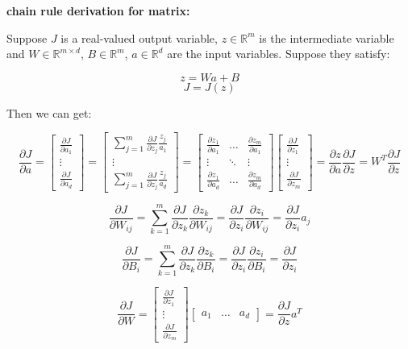 \documentclass{article}
\begin{document}
\noindent \textbf{chain rule derivation for matrix:}

\noindent Suppose \(J\) is a real-valued output variable, \(z \in \mathbb{R}^m\) is the intermediate variable and \(W \in \mathbb{R}^{m \times d}\), \(B \in \mathbb{R}^{m}\), \(a \in \mathbb{R}^d\) are the input variables. Suppose they satisfy:

\[z = W a + B\]
\[J = J(z)\]

\noindent Then we can get:

\[
\frac{\partial J}{\partial a} = 
\begin{bmatrix}
\frac{\partial J}{\partial a_1}\\
\vdots\\
\frac{\partial J}{\partial a_d}
\end{bmatrix}
= 
\begin{bmatrix}
\sum_{j = 1}^m \frac{\partial J}{\partial z_j} \frac{z_j}{a_1}\\
\vdots\\
\sum_{j = 1}^m \frac{\partial J}{\partial z_j} \frac{z_j}{a_d}
\end{bmatrix}
=
\begin{bmatrix}
\frac{\partial z_1}{\partial a_1} & \dots & \frac{\partial z_m}{\partial a_1}\\
\vdots & \ddots & \vdots\\
\frac{\partial z_1}{\partial a_d} & \dots & \frac{\partial z_m}{\partial a_d}
\end{bmatrix}
\begin{bmatrix}
\frac{\partial J}{\partial z_1}\\
\vdots\\
\frac{\partial J}{\partial z_m}
\end{bmatrix}
= \frac{\partial z}{\partial a} \frac{\partial J}{\partial z}
= W^T \frac{\partial J}{\partial z}
\]

\[
\frac{\partial J}{\partial W_{ij}} = \sum_{k = 1}^m \frac{\partial J}{\partial z_k} \frac{\partial z_k}{\partial W_{ij}} = \frac{\partial J}{\partial z_i} \frac{\partial z_i}{\partial W_{ij}} = \frac{\partial J}{\partial z_i} a_j
\]

\[
\frac{\partial J}{\partial B_{i}} = \sum_{k = 1}^m \frac{\partial J}{\partial z_k} \frac{\partial z_k}{\partial B_{i}} = \frac{\partial J}{\partial z_i} \frac{\partial z_i}{\partial B_{i}} = \frac{\partial J}{\partial z_i}
\]

\[
\frac{\partial J}{\partial W} = 
\begin{bmatrix}
\frac{\partial J}{\partial z_1}\\
\vdots\\
\frac{\partial J}{\partial z_m}
\end{bmatrix}
\begin{bmatrix}
a_1 & \dots & a_d
\end{bmatrix}
= \frac{\partial J}{\partial z} a^T
\]
\end{document}
